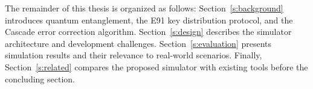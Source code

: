 The remainder of this thesis is organized as follows: Section~\ref{s:background} introduces quantum entanglement, the E91 key distribution protocol, and the Cascade error correction algorithm. Section~\ref{s:design} describes the simulator architecture and development challenges. Section~\ref{s:evaluation} presents simulation results and their relevance to real-world scenarios. Finally, Section~\ref{s:related} compares the proposed simulator with existing tools before the concluding section.
